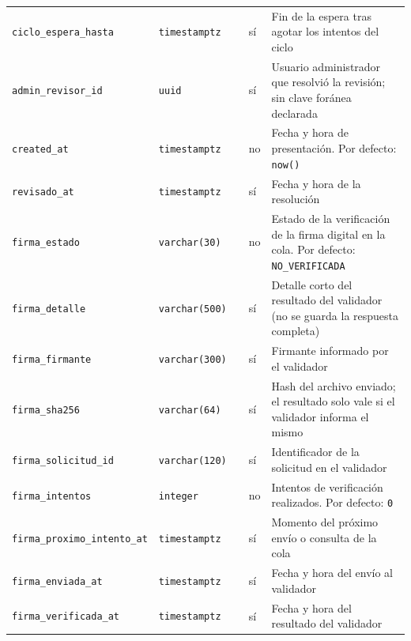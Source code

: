 {\begin{xltabular}{\textwidth}{@{}>{\raggedright\arraybackslash}p{3.6cm} >{\raggedright\arraybackslash}p{2.3cm} >{\raggedright\arraybackslash}p{1cm} >{\centering\arraybackslash}p{0.85cm} L@{}}
    \texttt{ciclo\_\allowbreak{}espera\_\allowbreak{}hasta} & \texttt{timestamptz} &  & sí & Fin de la espera tras agotar los intentos del ciclo \\
    \texttt{admin\_\allowbreak{}revisor\_\allowbreak{}id} & \texttt{uuid} &  & sí & Usuario administrador que resolvió la revisión; sin clave foránea declarada \\
    \texttt{created\_\allowbreak{}at} & \texttt{timestamptz} &  & no & Fecha y hora de presentación. Por defecto: \texttt{now(\allowbreak{})} \\
    \texttt{revisado\_\allowbreak{}at} & \texttt{timestamptz} &  & sí & Fecha y hora de la resolución \\
    \texttt{firma\_\allowbreak{}estado} & \texttt{varchar(\allowbreak{}30)} &  & no & Estado de la verificación de la firma digital en la cola. Por defecto: \texttt{\textquotesingle{}NO\_\allowbreak{}VERIFICADA\textquotesingle{}} \\
    \texttt{firma\_\allowbreak{}detalle} & \texttt{varchar(\allowbreak{}500)} &  & sí & Detalle corto del resultado del validador (no se guarda la respuesta completa) \\
    \texttt{firma\_\allowbreak{}firmante} & \texttt{varchar(\allowbreak{}300)} &  & sí & Firmante informado por el validador \\
    \texttt{firma\_\allowbreak{}sha256} & \texttt{varchar(\allowbreak{}64)} &  & sí & Hash del archivo enviado; el resultado solo vale si el validador informa el mismo \\
    \texttt{firma\_\allowbreak{}solicitud\_\allowbreak{}id} & \texttt{varchar(\allowbreak{}120)} &  & sí & Identificador de la solicitud en el validador \\
    \texttt{firma\_\allowbreak{}intentos} & \texttt{integer} &  & no & Intentos de verificación realizados. Por defecto: \texttt{0} \\
    \texttt{firma\_\allowbreak{}proximo\_\allowbreak{}intento\_\allowbreak{}at} & \texttt{timestamptz} &  & sí & Momento del próximo envío o consulta de la cola \\
    \texttt{firma\_\allowbreak{}enviada\_\allowbreak{}at} & \texttt{timestamptz} &  & sí & Fecha y hora del envío al validador \\
    \texttt{firma\_\allowbreak{}verificada\_\allowbreak{}at} & \texttt{timestamptz} &  & sí & Fecha y hora del resultado del validador \\
\end{xltabular}
}

